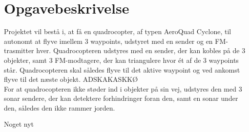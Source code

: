 \documentclass[Main]{subfiles}
\begin{document}
\chapter{Opgavebeskrivelse}
Projektet vil bestå i, at få en quadrocopter, af typen AeroQuad Cyclone, til autonomt at flyve imellem 3 waypoints, udstyret med en sender og en FM-trasmitter hver.
Quadrocopteren udstyres med en sender, der kan kobles på de 3 objekter, samt 3 FM-modtagere, der kan triangulere hvor ét af de 3 waypoints står. 
Quadrocopteren skal således flyve til det aktive waypoint og ved ankomst flyve til det næste objekt.
ADSKAKASKKØ\\
For at quadrocopteren ikke støder ind i objekter på sin vej, udstyres den med 3 sonar sendere, der kan detektere forhindringer foran den, samt en sonar under den, således den ikke rammer jorden.

Noget nyt
\end{document}
